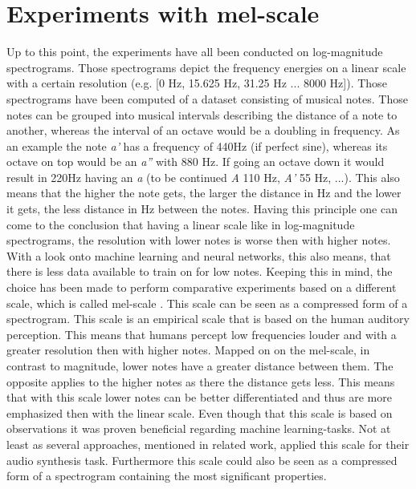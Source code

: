 \section{Experiments with mel-scale}
Up to this point, the experiments have all been conducted on log-magnitude spectrograms. Those spectrograms depict the frequency energies on a linear scale with a certain resolution (e.g. [0 Hz, 15.625 Hz, 31.25 Hz ... 8000 Hz]). Those spectrograms have been computed of a dataset consisting of musical notes. Those notes can be grouped into musical intervals describing the distance of a note to another, whereas the interval of an octave would be a doubling in frequency. As an example the note \textit{a'} has a frequency of 440Hz (if perfect sine), whereas its octave on top would be an \textit{a''} with 880 Hz. If going an octave down it would result in 220Hz having an \textit{a} (to be continued \textit{A} 110 Hz, \textit{A'} 55 Hz, ...). This also means that the higher the note gets, the larger the distance in Hz and the lower it gets, the less distance in Hz between the notes. Having this principle one can come to the conclusion that having a linear scale like in log-magnitude spectrograms, the resolution with lower notes is worse then with higher notes. With a look onto machine learning and neural networks, this also means, that there is less data available to train on for low notes.
Keeping this in mind, the choice has been made to perform comparative experiments based on a different scale, which is called mel-scale \cite{stevens1937scale}. This scale can be seen as a compressed form of a spectrogram. This scale is an empirical scale that is based on the human auditory perception. This means that humans percept low frequencies louder and with a greater resolution then with higher notes. Mapped on on the mel-scale, in contrast to magnitude, lower notes have a greater distance between them. The opposite applies to the higher notes as there the distance gets less. This means that with this scale lower notes can be better differentiated and thus are more emphasized then with the linear scale. Even though that this scale is based on observations it was proven beneficial regarding machine learning-tasks. Not at least as several approaches, mentioned in related work, applied this scale for their audio synthesis task. Furthermore this scale could also be seen as a compressed form of a spectrogram containing the most significant properties. 

